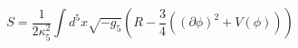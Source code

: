 \begin{equation}
S=\frac{1}{2\kappa_5^2}\int d^5x \sqrt{-g_5}\left(R-\frac{3}{4}\left(\left(\partial \phi\right)^2 
+V(\phi)\right)\right)
\end{equation}

